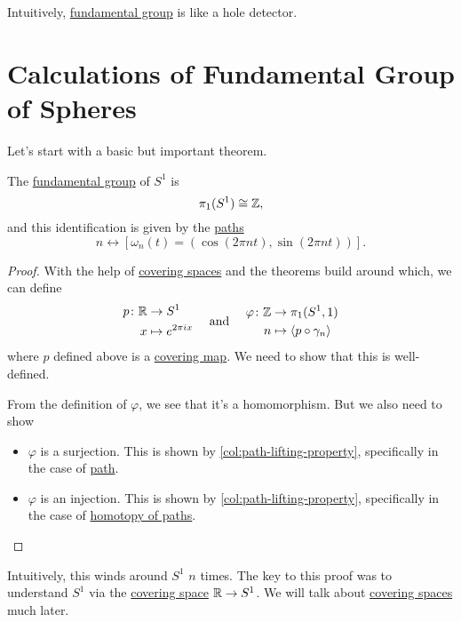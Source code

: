 \begin{prev}
	Intuitively, \hyperref[def:fundamental-group]{fundamental group} is like a hole detector.
\end{prev}

\section{Calculations of Fundamental Group of Spheres}
Let's start with a basic but important theorem.
\begin{theorem}
	The \hyperref[def:fundamental-group]{fundamental group} of \(S^1\) is
	\[
		\pi _1(S^1)\cong \mathbb{\MakeUppercase{z}},
	\]
	and this identification is given by the \hyperref[def:path]{paths}
	\[
		n \leftrightarrow [\omega_{n}(t) = (\cos (2\pi nt), \sin (2\pi nt))].
	\]
\end{theorem}
\begin{proof}
	With the help of \hyperref[def:covering-space]{covering spaces} and the theorems build around which, we can define
	\[
		\begin{split}
			p \colon \mathbb{\MakeUppercase{r}} &\to S^1\\
			x &\mapsto e^{2 \pi  i x}
		\end{split}\quad \text{ and }\quad\begin{split}
			\varphi \colon \mathbb{\MakeUppercase{z}} &\to \pi _1(S^1, 1)\\
			n &\mapsto \left< p\circ \gamma _n \right>
		\end{split}
	\]
	where \(p\) defined above is a \hyperref[def:covering-map]{covering map}. We need to show that this is well-defined.

	From the definition of \(\varphi \), we see that it's a homomorphism. But we also need to show
	\begin{itemize}
		\item \(\varphi \) is a surjection. This is shown by \autoref{col:path-lifting-property}, specifically in the case of \hyperref[def:path]{path}.
		\item \(\varphi \) is an injection. This is shown by \autoref{col:path-lifting-property}, specifically in the case of \hyperref[def:homotopy-path]{homotopy of paths}.
	\end{itemize}
\end{proof}
\begin{remark}
	Intuitively, this winds around \(S^1\) \(n\) times. The key to this proof was to understand \(S^1\) via the \hyperref[def:covering-space]{covering space}
	\(\mathbb{\MakeUppercase{r}} \to S^1\). We will talk about \hyperref[def:covering-space]{covering spaces} much later.
\end{remark}

